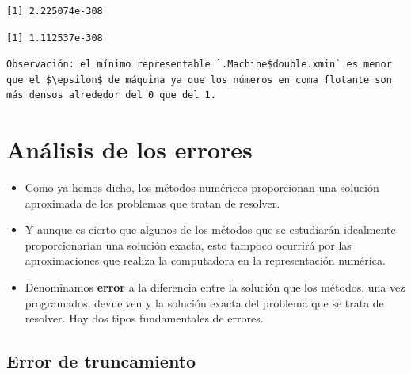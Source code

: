 \documentclass[]{book}
\newenvironment{Shaded}{\begin{snugshade}}{\end{snugshade}}
\newcommand{\CommentTok}[1]{\textcolor[rgb]{0.56,0.35,0.01}{\textit{#1}}}
\newcommand{\DecValTok}[1]{\textcolor[rgb]{0.00,0.00,0.81}{#1}}
\newcommand{\NormalTok}[1]{#1}
\newcommand{\OperatorTok}[1]{\textcolor[rgb]{0.81,0.36,0.00}{\textbf{#1}}}
\newcommand{\StringTok}[1]{\textcolor[rgb]{0.31,0.60,0.02}{#1}}
\providecommand{\tightlist}{%
  \setlength{\itemsep}{0pt}\setlength{\parskip}{0pt}}
\begin{document}
\begin{verbatim}
[1] 2.225074e-308
\end{verbatim}

\begin{Shaded}
\end{Shaded}

\begin{verbatim}
[1] 1.112537e-308
\end{verbatim}

\begin{verbatim}
Observación: el mínimo representable `.Machine$double.xmin` es menor que el $\epsilon$ de máquina ya que los números en coma flotante son más densos alrededor del 0 que del 1.
\end{verbatim}

\hypertarget{anuxe1lisis-de-los-errores}{%
\section{Análisis de los errores}\label{anuxe1lisis-de-los-errores}}

\begin{itemize}
\tightlist
\item
  Como ya hemos dicho, los métodos numéricos proporcionan una solución aproximada de los problemas que tratan de resolver.
\item
  Y aunque es cierto que algunos de los métodos que se estudiarán idealmente proporcionarían una solución exacta, esto tampoco ocurrirá por las aproximaciones que realiza la computadora en la representación numérica.
\item
  Denominamos \textbf{error} a la diferencia entre la solución que los métodos, una vez programados, devuelven y la solución exacta del problema que se trata de resolver. Hay dos tipos fundamentales de errores.
\end{itemize}

\hypertarget{error-de-truncamiento}{%
\subsection{Error de truncamiento}\label{error-de-truncamiento}}
\end{document}
